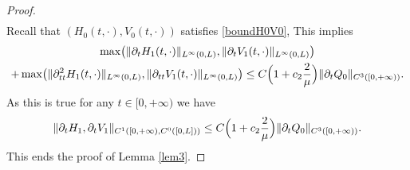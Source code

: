 \documentclass[JEP,XML,SOM,Unicode]{cedram}
\theoremstyle{definition}
\begin{document}
\begin{proof}
\begin{equation*}
\begin{split}
\end{split}
\end{equation*}
Recall that $(H_{0}(t,\cdot),V_{0}(t,\cdot))$ satisfies \eqref{boundH0V0},
{This implies}
\begin{multline*}
\max\bigl(\|\partial_{t}H_{1}(t,\cdot)\|_{L^{\infty}(0,L)},\|\partial_{t}V_{1}(t,\cdot)\|_{L^{\infty}(0,L)}\bigr)\\
+\max\bigl(\|\partial_{tt}^{2}H_{1}(t,\cdot)\|_{L^{\infty}(0,L)},\|\partial_{tt}V_{1}(t,\cdot)\|_{L^{\infty}(0,L)}\bigr)
\leq C\Bigl(1+c_{2} \frac{2}{\mu}\Bigr) \|\partial_{t}Q_{0}\|_{C^{3}([0,+\infty))}.
\end{multline*}
As this is true for any $t\in [0,+\infty)$ we have
\begin{equation*}
\|\partial_{t}H_{1},\partial_{t}V_{1}\|_{C^{1}([0,+\infty),C^{0}([0,L]))}\leq C\Bigl(1+c_{2} \frac{2}{\mu}\Bigr) \|\partial_{t}Q_{0}\|_{C^{3}([0,+\infty))}.
\end{equation*}
This ends the proof of Lemma \ref{lem3}.
\end{proof}
\end{document}
